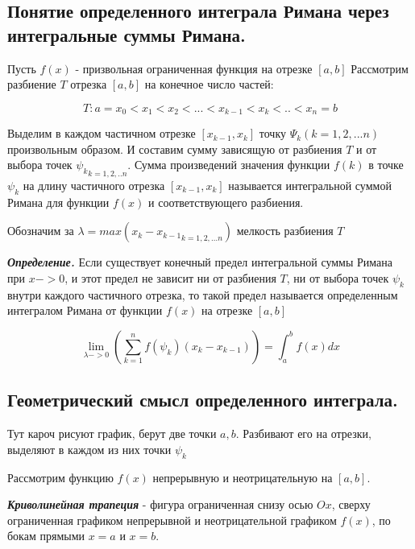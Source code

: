 \documentclass[a4paper,12pt]{article}
\theoremstyle{plain} %
\theoremstyle{definition} %
\theoremstyle{remark} %
\begin{document}
\newpage
\subsection*{Понятие определенного интеграла Римана через интегральные суммы Римана.                      }

Пусть $f(x)$ - призвольная ограниченная функция на отрезке $[a, b]$
Рассмотрим разбиение $T$ отрезка $[a, b]$ на конечное число частей:

\[
	T: a = x_0 < x_1 < x_2 < ... < x_{k - 1} < x_{k} < .. < x_n = b
\]

Выделим в каждом частичном отрезке $[x_{k-1}, x_k]$ точку $\Psi_k (k = 1, 2, ... n)$ произвольным образом.
И составим сумму зависящую от разбиения $T$ и от выбора точек ${\psi_k}_{k = 1, 2, .. n}$.
Сумма произведений значения функции $f(k)$ в точке $\psi_k$ на длину частичного отрезка $[x_{k-1}, x_k]$ называется интегральной суммой Римана для функции $f(x)$ и соответствующего разбиения.

Обозначим за $\lambda = max({x_k - x_{k-1}}_{k = 1, 2, ...n})$ мелкость разбиения $T$

\textit{\textbf{Определение.}} Если существует конечный предел интегральной суммы Римана при $x -> 0$, и этот предел не зависит ни от разбиения $T$, ни от выбора точек $\psi_k$ внутри каждого частичного отрезка, то такой предел называется определенным интегралом Римана от функции $f(x)$ на отрезке $[a, b]$

\[
	\lim_{\lambda -> 0} \left( \sum_{k = 1}^nf(\psi_k)(x_k - x_{k-1}) \right) =
	\int_a^b f(x) dx
\]

\newpage
\subsection*{Геометрический смысл определенного интеграла.                                                }

Тут кароч рисуют график, берут две точки $a, b$. Разбивают его на отрезки, выделяют в каждом из них точки $\psi_k$

Рассмотрим функцию $f(x)$ непрерывную и неотрицательную на $[a, b]$.

\textit{\textbf{Криволинейная трапеция}} - фигура ограниченная снизу осью $Ox$, сверху ограниченная графиком непрерывной и неотрицательной графиком $f(x)$, по бокам прямыми $x = a$ и $x = b$.
\end{document}
